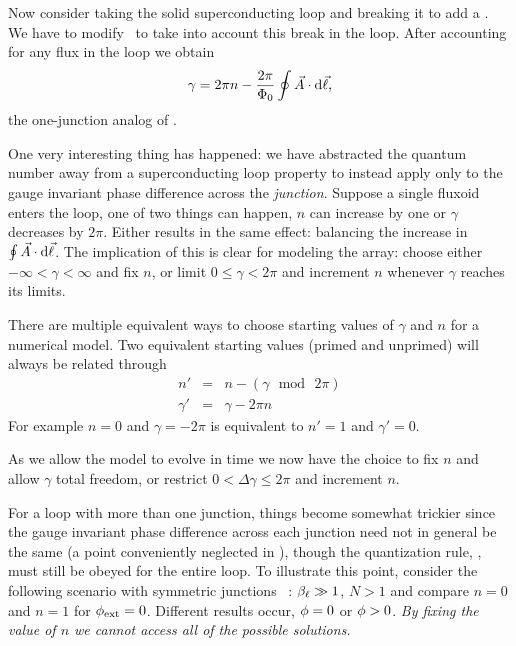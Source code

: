Now consider taking the solid superconducting loop and breaking it
to add a \jjnoun. 
We have to modify \
to take into account this break in the loop. After 
accounting for any flux in the loop we obtain
%
\begin{equation}
\gamma = 2\pi n - {2\pi\over\Phi_0}\oint \vec{A}\cdot\mathrm{d}\vec\ell \mbox{,} 
\end{equation} 
%
the one-junction analog of . 

One very interesting thing has happened: we have abstracted the quantum 
number away from a superconducting loop property to instead apply only
to the gauge invariant phase difference across the
\emph{junction}. 
Suppose a single fluxoid enters the loop, one of two things can 
happen, $n$ can increase by one or $\gamma$ decreases by $2\pi$. 
Either results in the 
same effect: balancing the increase in 
$\oint\vec{A}\cdot\mathrm{d}\vec\ell$. 
The implication of this is clear for 
modeling the array: choose either $-\infty<\gamma<\infty$ 
and fix $n$, or limit $0 \le\gamma < 2\pi$ and increment
$n$ whenever $\gamma$ reaches its limits. 

There are multiple equivalent ways to choose starting 
values of $\gamma$ and $n$ for a numerical
model. 
Two equivalent starting values (primed and unprimed) will
always be related through
%
\begin{eqnarray}
n'      & = & n - (\gamma \,\bmod\, 2\pi) \nonumber \\
\gamma' & = & \gamma - 2 \pi n
\end{eqnarray}
%
For example
$n=0$ and $\gamma=-2\pi$ is equivalent to $n'=1$ and $\gamma'=0$.

As we allow the model to evolve in time 
we now have the choice to fix $n$ and 
allow $\gamma$ total freedom, or restrict $0< \Delta\gamma\leq 2 \pi$ 
and increment $n$.

For a loop with more than one junction, things become somewhat trickier
since the gauge invariant phase difference across each junction 
need not in general be the same
(a point conveniently neglected in ), though the
quantization rule, \EqnRef{eqn:fluxoidquant}, must still be obeyed for 
the entire loop. To illustrate this point, consider the following 
scenario with symmetric junctions \ala\ \EqnRef{eqn:symmetry}:
$\beta_\ell \gg 1$, $N>1$ and  compare $n=0$ and $n=1$ for $\phi_{\mathrm{ext}} = 0$.
Different results occur, $\phi = 0$ or $\phi > 0$. \emph{By 
fixing the value of $n$ we cannot access all of the possible 
solutions.}

